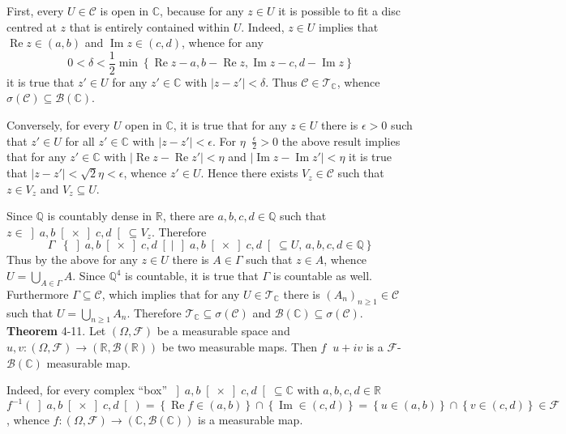 \documentclass[a4paper]{article}
\newcommand{\obj}[1]{\left\{ #1 \right \}}
\newcommand{\brac}[1]{\left ( #1 \right )}
\newcommand{\crab}[1]{\left ] #1 \right [}
\newcommand{\induc}[1]{\left . #1 \right \vert}
\newcommand{\abs}[1]{\left | #1 \right |}
\newcommand{\Real}{\mathbb{R}}
\newcommand{\Cplx}{\mathbb{C}}
\newcommand{\Tcal}{\mathcal{T}}
\newcommand{\Ccal}{\mathcal{C}}
\newcommand{\Fcal}{\mathcal{F}}
\newcommand{\borel}[1]{\mathcal{B}\brac{#1}}
\newcommand{\defn}{\mathop{\overset{\Delta}{=}}\nolimits}
\newcommand{\re}{\operatorname{Re}\nolimits}
\newcommand{\im}{\operatorname{Im}\nolimits}
\begin{document}
First, every $U\in \Ccal$ is open in $\Cplx$, because for any $z\in U$ it is possible to fit a disc centred at $z$ that is entirely contained within $U$. Indeed, $z\in U$ implies that $\re z\in\brac{a,b}$ and $\im z\in\brac{c,d}$, whence for any \[0<\delta < \frac{1}{2}\min\obj{\re z-a, b-\re z, \im z - c, d-\im z}\] it is true that $z'\in U$ for any $z'\in \Cplx$ with $\abs{z-z'}<\delta$. Thus $\Ccal\in \Tcal_\Cplx$, whence $\sigma\brac{\Ccal}\subseteq \borel{\Cplx}$.

Conversely, for every $U$ open in $\Cplx$, it is true that for any $z\in U$ there is $\epsilon>0$ such that $z'\in U$ for all $z'\in\Cplx$ with $\abs{z-z'}<\epsilon$. For $\eta\defn \frac{\epsilon}{2}>0$ the above result implies that for any $z'\in\Cplx$ with $\abs{\re z-\re z'}<\eta$ and $\abs{\im z-\im z'}<\eta$ it is true that $\abs{z-z'}<\sqrt{2}\eta<\epsilon$, whence $z'\in U$. Hence there exists $V_z\in \Ccal$ such that $z\in V_z$ and $V_z\subseteq U$.

Since $\mathbb{Q}$ is countably dense in $\Real$, there are $a,b,c,d\in \mathbb{Q}$ such that $z\in \crab{a,b}\times\crab{c,d} \subseteq V_z$. Therefore \[\Gamma\defn \obj{\induc{\crab{a,b}\times\crab{c,d}}\,\crab{a,b}\times\crab{c,d}\subseteq U,\,a,b,c,d\in \mathbb{Q}}\] Thus by the above for any $z\in U$ there is $A\in \Gamma$ such that $z\in A$, whence $U=\bigcup_{A\in\Gamma}A$. Since $\mathbb{Q}^4$ is countable, it is true that $\Gamma$ is countable as well. Furthermore $\Gamma\subseteq \Ccal$, which implies that for any $U\in \Tcal_\Cplx$ there is $\brac{A_n}_{n\geq1}\in \Ccal$ such that $U=\bigcup_{n\geq1} A_n$. Therefore $\Tcal_\Cplx\subseteq \sigma\brac{\Ccal}$ and $\borel{\Cplx}\subseteq\sigma\brac{\Ccal}$.\\

\label{thm:cplx_func_part_meas} \noindent \textbf{Theorem} 4-11.
Let $\brac{\Omega, \Fcal}$ be a measurable space and $u,v:\brac{\Omega, \Fcal}\to\brac{\Real,\borel{\Real}}$ be two measurable maps. Then $f\defn u+iv$ is a $\Fcal$-$\borel{\Cplx}$ measurable map.

Indeed, for every complex ``box'' $\crab{a,b}\times\crab{c,d}\subseteq \Cplx$ with $a,b,c,d \in \Real$ \[f^{-1}\brac{\crab{a,b}\times\crab{c,d}} = \obj{\re f\in \brac{a,b}}\cap \obj{\im \in \brac{c,d}} = \obj{u\in \brac{a,b}}\cap \obj{v \in \brac{c,d}} \in \Fcal\], whence $f:\brac{\Omega, \Fcal}\to\brac{\Cplx, \borel{\Cplx}}$ is a measurable map.\\

\end{document}
